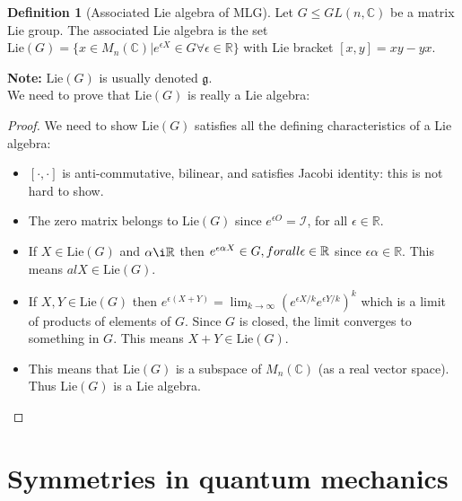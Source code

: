 \documentclass{book}
\theoremstyle{definition}
\newtheorem{defn}{Definition}[section]
\newcommand{\R}{\mathbb{R}}
\newcommand{\C}{\mathbb{C}}
\newcommand{\al}{\alpha}
\newcommand{\ep}{\epsilon}
\newcommand{\lp}{\left(}
\newcommand{\rp}{\right)}
\newcommand{\Id}{\mathcal{I}}
\begin{document}
\begin{defn}[Associated Lie algebra of MLG]
	Let $G \leq GL(n,\C)$ be a matrix Lie group. The associated Lie algebra is the set $\text{Lie}(G) = \{  x\in M_n(\C) \vert e^{\epsilon X} \in G \forall \epsilon \in \R   \}$ with Lie bracket $[x,y] = xy-yx$.
\end{defn}

\textbf{Note:} $\text{Lie}(G)$ is usually denoted $\mathfrak{g}$.\\

We need to prove that $\text{Lie}(G)$ is really a Lie algebra:
\begin{proof}
	We need to show Lie$(G)$ satisfies all the defining characteristics of a Lie algebra:
	\begin{itemize}
		\item $[\cdot,\cdot]$ is anti-commutative, bilinear, and satisfies Jacobi identity: this is not hard to show.
		
		\item The zero matrix belongs to Lie$(G)$ since $e^{\epsilon O} = \Id$, for all $\ep\in \R$. 
		
		\item If $X \in \text{Lie}(G)$ and $\al\i \R$ then $e^{\ep \al X} \in G,\\forall \ep \in \R$ since $\ep\al \in \R$. This means $al X \in \text{Lie}(G)$.
		
		\item If $X,Y \in \text{Lie}(G)$ then $e^{\ep(X+Y)} = \lim_{k\to \infty}\lp e^{\ep X/k}e^{\ep Y/k} \rp^{k}$ which is a limit of products of elements of $G$. Since $G$ is closed, the limit converges to something in $G$. This means $X+Y\in \text{Lie}(G)$.
		
		\item This means that $\text{Lie}(G)$ is a subspace of $M_n(\C)$ (as a real vector space). Thus Lie$(G)$ is a Lie algebra. 
		
	\end{itemize}
\end{proof} 












\newpage
\section{Symmetries in quantum mechanics}
\end{document}
